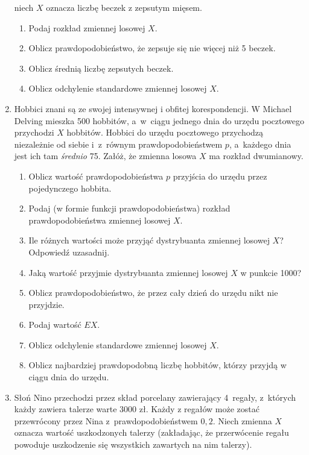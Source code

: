 \documentclass[twoside]{mwart}
\newcommand{\ans}[1]{}
\newcommand{\ans}[1]{\par\emph{Odpowiedź:} #1}
\begin{document}
\begin{enumerate}
niech $X$ oznacza liczbę beczek z zepsutym mięsem.  \begin{enumerate}
\item Podaj rozkład zmiennej losowej $X$. \ans{$P(X=k)={1000\choose k}p^k(1-p)^{1000-k}\approx\frac{\lambda^k}{k!}e^{-\lambda} \quad \lambda=1000\cdot0{,}0045=4{,}5$}
\item Oblicz prawdopodobieństwo, że zepsuje się nie więcej niż 5 beczek. \ans{$P(X\leq 5)=0{,}70290$}
\item Oblicz średnią liczbę zepsutych beczek. \ans{$EX=4{,}5$}
\item Oblicz odchylenie standardowe zmiennej losowej $X$. \ans{$DX=\sqrt{4{,}5}$}
\end{enumerate}
\item Hobbici znani są ze swojej intensywnej i obfitej korespondencji. W Michael
Delving mieszka 500 hobbitów, a~w~ciągu jednego dnia do urzędu pocztowego
przychodzi $X$ hobbitów. Hobbici do urzędu pocztowego przychodzą niezależnie od
siebie i~z~równym prawdopodobieństwem $p$, a~każdego dnia jest ich tam
\emph{średnio} 75. Załóż, że zmienna losowa $X$ ma rozkład dwumianowy.
\begin{enumerate}
\item Oblicz wartość prawdopodobieństwa $p$ przyjścia do urzędu przez pojedynczego hobbita.
\item Podaj  (w formie funkcji prawdopodobieństwa) rozkład prawdopodobieństwa zmiennej losowej $X$.
\item Ile różnych wartości może przyjąć dystrybuanta zmiennej losowej $X$? Odpowiedź uzasadnij.
\item Jaką wartość przyjmie dystrybuanta zmiennej losowej $X$ w punkcie 1000?
\item Oblicz prawdopodobieństwo, że przez cały dzień do urzędu nikt nie przyjdzie.
\item Podaj wartość $EX$.
\item Oblicz odchylenie standardowe zmiennej losowej $X$.
\item Oblicz najbardziej prawdopodobną liczbę hobbitów, którzy przyjdą w ciągu dnia do urzędu.
\end{enumerate}
\item Słoń Nino przechodzi przez skład porcelany zawierający 4~regały, z~których każdy zawiera talerze warte 3000 zł.
	Każdy z regałów może zostać przewrócony przez Nina z~prawdopodobieństwem $0{,}2$.
	Niech zmienna $X$ oznacza wartość uszkodzonych talerzy (zakładając, że przerwócenie regału powoduje uszkodzenie się wszystkich zawartych na nim talerzy).

\end{enumerate}
\end{document}
